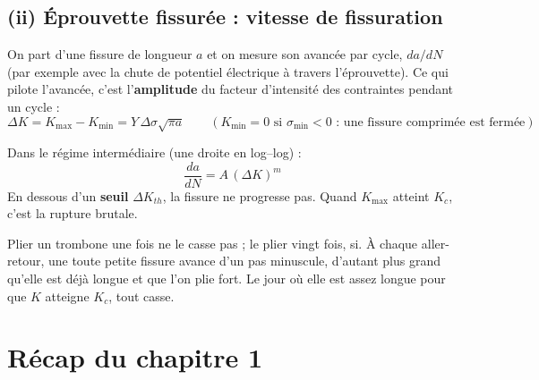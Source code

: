 \subsection*{(ii) Éprouvette fissurée : vitesse de fissuration}

On part d'une fissure de longueur $a$ et on mesure son avancée par cycle, $da/dN$ (par exemple
avec la chute de potentiel électrique à travers l'éprouvette). Ce qui pilote l'avancée, c'est
l'\textbf{amplitude} du facteur d'intensité des contraintes pendant un cycle :
\[ \Delta K = K_{\max} - K_{\min} = Y\,\Delta\sigma\sqrt{\pi a}
   \qquad (K_{\min} = 0 \text{ si } \sigma_{\min} < 0 \text{ : une fissure comprimée est fermée}) \]


\begin{thmbox}[title={Loi de Paris}]
Dans le régime intermédiaire (une droite en log--log) :
\[ \frac{da}{dN} = A\,(\Delta K)^m \]
En dessous d'un \textbf{seuil} $\Delta K_{th}$, la fissure ne progresse pas. Quand $K_{\max}$
atteint $K_c$, c'est la rupture brutale.
\end{thmbox}

\begin{goatbox}
Plier un trombone une fois ne le casse pas ; le plier vingt fois, si. À chaque aller-retour, une
toute petite fissure avance d'un pas minuscule, d'autant plus grand qu'elle est déjà longue et
que l'on plie fort. Le jour où elle est assez longue pour que $K$ atteigne $K_c$, tout casse.
\end{goatbox}

\section*{Récap du chapitre 1}

